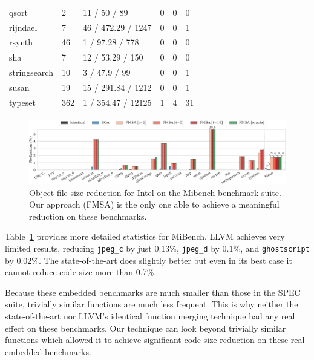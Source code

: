 \begin{table}[h]
{\begin{tabular}{llllll}
                     qsort         & 2     & 11 / 50 / 89         & 0     & 0   & 0    \\
\rowcolor{evencolor} rijndael      & 7     & 46 / 472.29 / 1247   & 0     & 0   & 1    \\
                     rsynth        & 46    & 1 / 97.28 / 778      & 0     & 0   & 0    \\
\rowcolor{evencolor} sha           & 7     & 12 / 53.29 / 150     & 0     & 0   & 0    \\
                     stringsearch  & 10    & 3 / 47.9 / 99        & 0     & 0   & 1    \\
\rowcolor{evencolor} susan         & 19    & 15 / 291.84 / 1212   & 0     & 0   & 1    \\
                     typeset       & 362   & 1 / 354.47 / 12125   & 1     & 4   & 31   \\
\bottomrule
\end{tabular}
}
\label{tab:stats-mibench}
\end{table}


\begin{figure}[t]
  \centering
  \includegraphics[width=\linewidth]{figs/code-size-reduction-mibench.pdf}
  \caption{Object file size reduction for Intel on the Mibench benchmark suite.
   Our approach (FMSA) is the only one able to achieve a meaningful reduction on these benchmarks.}
  \label{fig:code-size-reduction-mibench}
\end{figure}

Table~\ref{tab:stats-mibench} provides more detailed statistics for MiBench.
LLVM achieves very limited results, reducing \texttt{jpeg\_c} by just 0.13\%,
\texttt{jpeg\_d} by 0.1\%, and \texttt{ghostscript} by 0.02\%.
The state-of-the-art does slightly better but even in its best case it cannot reduce code size more than 0.7\%.

Because these embedded benchmarks are much smaller than those in the SPEC suite, trivially similar functions are much less frequent.
This is why neither the state-of-the-art nor LLVM's identical function merging technique had any real effect on these benchmarks.
Our technique can look beyond trivially similar functions which allowed it to achieve significant code size reduction on these real embedded benchmarks.

